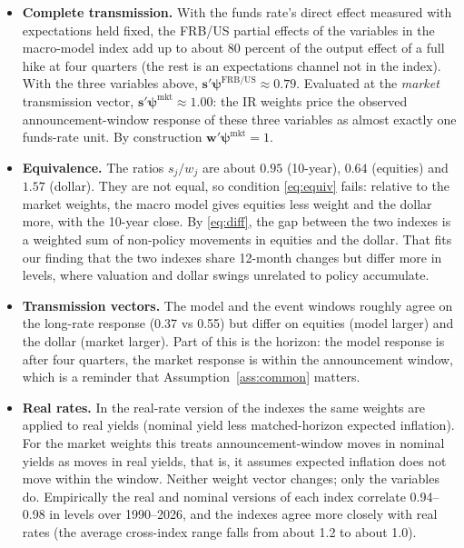 \documentclass[11pt]{article}
\theoremstyle{definition}
\theoremstyle{remark}
\newcommand{\bpsi}{\boldsymbol{\psi}}
\newcommand{\bs}{\mathbf{s}}
\newcommand{\bw}{\mathbf{w}}
\begin{document}
\begin{itemize}[leftmargin=2em]
\item \textbf{Complete transmission.} With the funds rate's direct effect measured with expectations held fixed, the FRB/US partial effects of the variables in the macro-model index add up to about 80 percent of the output effect of a full hike at four quarters (the rest is an expectations channel not in the index). With the three variables above, $\bs'\bpsi^{\text{FRB/US}}\approx0.79$. Evaluated at the \emph{market} transmission vector, $\bs'\bpsi^{\text{mkt}}\approx1.00$: the IR weights price the observed announcement-window response of these three variables as almost exactly one funds-rate unit. By construction $\bw'\bpsi^{\text{mkt}}=1$.
\item \textbf{Equivalence.} The ratios $s_j/w_j$ are about $0.95$ (10-year), $0.64$ (equities) and $1.57$ (dollar). They are not equal, so condition \eqref{eq:equiv} fails: relative to the market weights, the macro model gives equities less weight and the dollar more, with the 10-year close. By \eqref{eq:diff}, the gap between the two indexes is a weighted sum of non-policy movements in equities and the dollar. That fits our finding that the two indexes share 12-month changes but differ more in levels, where valuation and dollar swings unrelated to policy accumulate.
\item \textbf{Transmission vectors.} The model and the event windows roughly agree on the long-rate response (0.37 vs 0.55) but differ on equities (model larger) and the dollar (market larger). Part of this is the horizon: the model response is after four quarters, the market response is within the announcement window, which is a reminder that Assumption~\ref{ass:common} matters.
\item \textbf{Real rates.} In the real-rate version of the indexes the same weights are applied to real yields (nominal yield less matched-horizon expected inflation). For the market weights this treats announcement-window moves in nominal yields as moves in real yields, that is, it assumes expected inflation does not move within the window. Neither weight vector changes; only the variables do. Empirically the real and nominal versions of each index correlate 0.94--0.98 in levels over 1990--2026, and the indexes agree more closely with real rates (the average cross-index range falls from about 1.2 to about 1.0).

\end{itemize}
\end{document}
